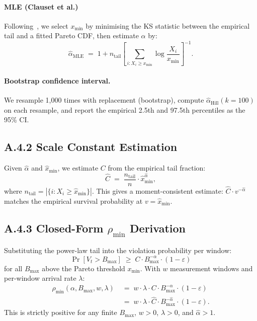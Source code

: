 \paragraph{MLE (Clauset et al.)}
Following~\cite{Clauset2009}, we select $x_{\min}$ by minimising
the KS statistic between the empirical tail and a fitted Pareto CDF,
then estimate $\alpha$ by:
\[
  \hat{\alpha}_{\mathrm{MLE}} \;=\; 1 + n_{\mathrm{tail}}
  \left[\sum_{i: X_i \geq x_{\min}} \log \frac{X_i}{x_{\min}}\right]^{-1}.
\]

\paragraph{Bootstrap confidence interval.}
We resample 1,000 times with replacement (bootstrap), compute
$\hat{\alpha}_{\mathrm{Hill}}(k=100)$ on each resample, and report
the empirical 2.5th and 97.5th percentiles as the 95\% CI.

\subsection*{A.4.2 Scale Constant Estimation}

Given $\hat{\alpha}$ and $\hat{x}_{\min}$, we estimate $C$ from the
empirical tail fraction:
\[
  \hat{C} \;=\; \frac{n_{\mathrm{tail}}}{n} \cdot \hat{x}_{\min}^{\hat{\alpha}},
\]
where $n_{\mathrm{tail}} = |\{i : X_i \geq \hat{x}_{\min}\}|$.
This gives a moment-consistent estimate: $\hat{C} \cdot v^{-\hat{\alpha}}$
matches the empirical survival probability at $v = \hat{x}_{\min}$.

\subsection*{A.4.3 Closed-Form $\rho_{\min}$ Derivation}

Substituting the power-law tail into the violation probability per window:
\[
  \Pr[V_t > B_{\max}] \;\geq\; C \cdot B_{\max}^{-\alpha} \cdot (1-\varepsilon)
\]
for all $B_{\max}$ above the Pareto threshold $x_{\min}$.
With $w$ measurement windows and per-window arrival rate $\lambda$:
\begin{align*}
  \rho_{\min}(\alpha, B_{\max}, w, \lambda)
  &\;=\; w \cdot \lambda \cdot C \cdot B_{\max}^{-\alpha} \cdot (1-\varepsilon) \\
  &\;=\; w \cdot \lambda \cdot \hat{C} \cdot B_{\max}^{-\hat{\alpha}} \cdot (1-\varepsilon).
\end{align*}
This is strictly positive for any finite $B_{\max}$, $w>0$, $\lambda>0$,
and $\hat{\alpha}>1$.

